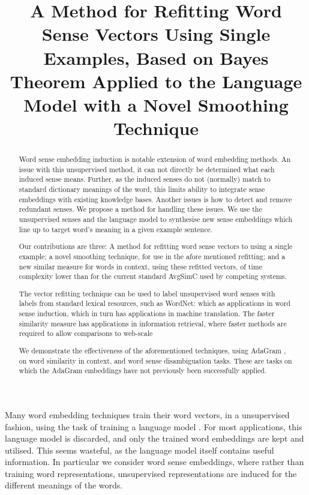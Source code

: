 \documentclass{sig-alternate}
\begin{document}
\title{A Method for Refitting Word Sense Vectors Using Single Examples, Based on Bayes Theorem Applied to the Language Model with a Novel Smoothing Technique}
\maketitle

\begin{abstract}
Word sense embedding induction is notable extension of word embedding methods.
An issue with this unsupervised method, it can not directly be determined what each induced sense means. Further, as the induced senses do not (normally) match to standard dictionary meanings of the word, this limits ability to integrate sense embeddings with existing knowledge bases. Another issues is how to detect and remove redundant senses.
We propose a method for handling these issues.
We use the unsupervised senses and the language model to synthesise new sense embeddings which line up to target word's meaning in a given example sentence.


Our contributions are three:
A method for refitting word sense vectors to using a single example;
a novel smoothing technique, for use in the afore mentioned refitting;
and a new similar measure for words in context, using these refitted vectors, of time complexity lower than for the current standard AvgSimC used by competing systems.

The vector refitting technique can be used to label unsupervised word senses with labels from standard lexical resources, such as WordNet: which as applications in word sense induction, which in turn has applications in machine translation.
The faster similarity measure has applications in information retrieval, where faster methods are required to allow comparisons to web-scale 


We demonstrate the effectiveness of the aforementioned techniques, using AdaGram \parencite{AdaGrams}, on word similarity in context, and word sense disambiguation tasks. These are tasks on which the AdaGram embeddings have not previously been successfully applied.
\end{abstract}


Many word embedding techniques train their word vectors, in a unsupervised fashion, using the task of training a language model \parencite{NPLM, collobert2008unified, mikolov2013efficient}.
For most applications, this language model is discarded, and only the trained word embeddings are kept and utilised.
This seems wasteful, as the language model itself contains useful information. In particular we consider word sense embeddings, where rather than training word representations, unsupervised representations are induced for the different meanings of the words.
\end{document}
